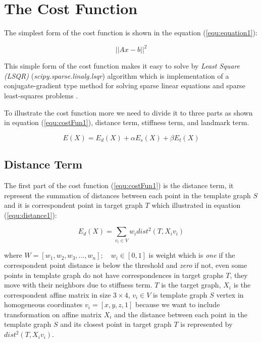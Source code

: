 \documentclass[../structure.tex]{subfiles}
\begin{document}

\section{The Cost Function}
\hspace{2em}The simplest form of the cost function is shown in the equation (\ref{equ:equation1}):

\begin{equation}
\label{equ:equation1}
||Ax-b||^2
\end{equation}

This simple form of the cost function makes it easy to solve by \textit{Least Square (LSQR)} (\textit{scipy.sparse.linalg.lsqr}) algorithm which is implementation of a conjugate-gradient type method for solving sparse linear equations and sparse least-squares problems \cite{Paige1982a}.

To illustrate the cost function more we need to divide it to three parts as shown in equation (\ref{equ:costFun1}), distance term, stiffness term, and landmark term.

\begin{equation}
E(X) = E_{d}(X) + \alpha E_{s}(X) + \beta E_{t}(X)
\label{equ:costFun1}
\end{equation}

\subsection{Distance Term}
\hspace{2em}The first part of the cost function (\ref{equ:costFun1}) is the distance term, it represent the summation of distances between each point in the template graph $S$ and it is correspondent point in target graph $T$ which illustrated in equation (\ref{equ:distance1}):

\begin{equation}
E_{d}(X) = \sum_{v_{i} \in V} w_{i}dist^2(T,X_{i}v_{i})
\label{equ:distance1}
\end{equation}

where $W = [w_{1}, w_{2}, w_{3}, ..., w_{n}];\quad w_{i}\in [0,1]$ is weight which is \textit{one} if the correspondent point distance is below the threshold and \textit{zero} if not, even some points in template graph do not have correspondences in target graphs $T$, they move with their neighbors due to stiffness term. $T$ is the target graph, $X_{i}$ is the correspondent affine matrix in size $3\times4$, $v_{i}\in V$ is template graph $S$ vertex in homogeneous coordinates $v_{i} = [x,y,z,1]$ because we want to include transformation on affine matrix $X_{i}$ and the distance between each point in the template graph $S$ and its closest point in target graph $T$ is represented by $dist^2(T,X_{i}v_{i})$.
\end{document}
